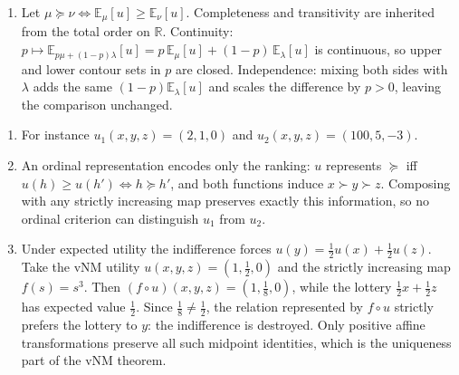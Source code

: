 \documentclass[11pt]{article}
\newcommand{\R}{\mathbb{R}}
\newcommand{\pref}{\succcurlyeq}
\newcommand{\strictpref}{\succ}
\begin{document}
\begin{solution}
\begin{enumerate}[label=(\alph*)]
$u'(b)-u'(w)$, the latter strictly positive because $b\strictpref w$ and
$u'$ represents $\pref$. (Note the statement's scalars $a,b$ are unrelated
to the trajectories $b,w$ of part~(a); the letter $b$ does double duty here,
so read $u'(b)$ as the utility of the best trajectory throughout.)
\item Let $\mu\pref\nu\iff \mathbb{E}_\mu[u]\geq\mathbb{E}_\nu[u]$.
Completeness and transitivity are inherited from the total order on $\R$.
Continuity: $p\mapsto \mathbb{E}_{p\mu+(1-p)\lambda}[u]
=p\,\mathbb{E}_\mu[u]+(1-p)\,\mathbb{E}_\lambda[u]$ is continuous, so upper
and lower contour sets in $p$ are closed. Independence: mixing both sides
with $\lambda$ adds the same $(1-p)\mathbb{E}_\lambda[u]$ and scales the
difference by $p>0$, leaving the comparison unchanged.
\end{enumerate}
\end{solution}

\begin{solution}
\begin{enumerate}[label=(\alph*)]
\item For instance $u_1(x,y,z)=(2,1,0)$ and $u_2(x,y,z)=(100,5,-3)$.
\item An ordinal representation encodes only the ranking: $u$ represents
$\pref$ iff $u(h)\geq u(h')\iff h\pref h'$, and both functions induce
$x\strictpref y\strictpref z$. Composing with any strictly increasing map
preserves exactly this information, so no ordinal criterion can distinguish
$u_1$ from $u_2$.
\item Under expected utility the indifference forces
$u(y)=\tfrac12 u(x)+\tfrac12 u(z)$. Take the vNM utility
$u(x,y,z)=(1,\tfrac12,0)$ and the strictly increasing map $f(s)=s^3$. Then
$(f\circ u)(x,y,z)=(1,\tfrac18,0)$, while the lottery
$\tfrac12 x+\tfrac12 z$ has expected value $\tfrac12$. Since
$\tfrac18\neq\tfrac12$, the relation represented by $f\circ u$ strictly
prefers the lottery to $y$: the indifference is destroyed. Only positive
affine transformations preserve all such midpoint identities, which is the
uniqueness part of the vNM theorem.
\end{enumerate}
\end{solution}
\end{document}
